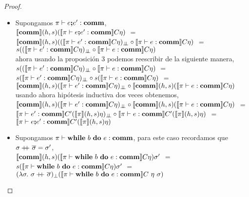 \begin{proof}
\begin{itemize}
\begin{itemize}
\item Supongamos $\pi \vdash e \textbf{;} e' : \textbf{comm}$,\\

$\llbracket \textbf{comm} \rrbracket(h,s)(\llbracket \pi \vdash e \textbf{;} e' : \textbf{comm} \rrbracket C\eta)$ $=$\\
$\llbracket \textbf{comm} \rrbracket(h,s)
	((\llbracket \pi \vdash e' : \textbf{comm} \rrbracket C\eta)_{\bot \!\!\! \bot} 
	\circ
	\llbracket \pi \vdash e : \textbf{comm} \rrbracket C\eta
	)$ $=$ \\
$s((\llbracket \pi \vdash e' : \textbf{comm} \rrbracket C\eta)_{\bot \!\!\! \bot} 
	\circ
	\llbracket \pi \vdash e : \textbf{comm} \rrbracket C\eta
	)$\\

ahora usando la proposici\'on 3 podemos reescribir de la siguiente manera,\\

$s((\llbracket \pi \vdash e' : \textbf{comm} \rrbracket C\eta)_{\bot \!\!\! \bot} 
	\circ
	\llbracket \pi \vdash e : \textbf{comm} \rrbracket C\eta
	)$ $=$\\
$s(\llbracket \pi \vdash e' : \textbf{comm} \rrbracket C\eta)_{\bot \!\!\! \bot} 
	\circ
	s(\llbracket \pi \vdash e : \textbf{comm} \rrbracket C\eta)$ $=$\\
$\llbracket \textbf{comm} \rrbracket(h,s)(\llbracket \pi \vdash e' : \textbf{comm} \rrbracket C\eta)_{\bot \!\!\! \bot} 
	\circ
 \llbracket \textbf{comm} \rrbracket(h,s)(\llbracket \pi \vdash e : \textbf{comm} \rrbracket C\eta)$\\

usando ahora hip\'otesis inductiva dos veces obtenemos,\\

$\llbracket \textbf{comm} \rrbracket(h,s)(\llbracket \pi \vdash e' : \textbf{comm} \rrbracket C\eta)_{\bot \!\!\! \bot} 
	\circ
 \llbracket \textbf{comm} \rrbracket(h,s)(\llbracket \pi \vdash e : \textbf{comm} \rrbracket C\eta)$ $=$\\
$\llbracket \pi \vdash e' : \textbf{comm} \rrbracket C'(\llbracket \pi \rrbracket(h,s)\eta)_{\bot \!\!\! \bot}
	\circ
\llbracket \pi \vdash e : \textbf{comm} \rrbracket C'(\llbracket \pi \rrbracket(h,s)\eta)$ $=$\\
$\llbracket \pi \vdash e \textbf{;} e' : \textbf{comm} \rrbracket C'(\llbracket \pi \rrbracket(h,s)\eta)$\\

\item Supongamos $\pi \vdash \textbf{while} \ b \ \textbf{do} \ e : \textbf{comm}$, para este caso
recordamos que $\sigma +\kern-1.3ex+\kern0.8ex \overline{\sigma} = \sigma'$,\\

$\llbracket \textbf{comm} \rrbracket(h,s)(\llbracket \pi \vdash \textbf{while} \ b \ \textbf{do} \ e : \textbf{comm} \rrbracket C\eta)\sigma'$ $=$\\
$s(\llbracket \pi \vdash \textbf{while} \ b \ \textbf{do} \ e : \textbf{comm} \rrbracket C\eta)\sigma'$ $=$\\
$(\lambda \sigma. \ \sigma +\kern-1.3ex+\kern0.8ex \overline{\sigma})_{\bot}
				(\llbracket \pi \vdash \textbf{while} \ b \ \textbf{do} \ e : \textbf{comm} \rrbracket C \ \eta \ \sigma)$\\


\end{itemize}
\end{itemize}
\end{proof}

